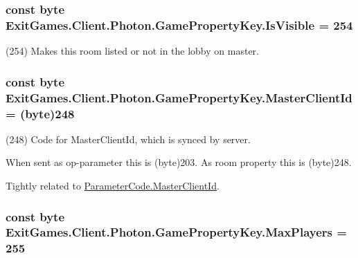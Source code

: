 \subsubsection[{\texorpdfstring{Is\+Visible}{IsVisible}}]{\setlength{\rightskip}{0pt plus 5cm}const byte Exit\+Games.\+Client.\+Photon.\+Game\+Property\+Key.\+Is\+Visible = 254}\hypertarget{class_exit_games_1_1_client_1_1_photon_1_1_game_property_key_a0993168380169958a6371abb880808ed}{}\label{class_exit_games_1_1_client_1_1_photon_1_1_game_property_key_a0993168380169958a6371abb880808ed}


(254) Makes this room listed or not in the lobby on master.

\subsubsection[{\texorpdfstring{Master\+Client\+Id}{MasterClientId}}]{\setlength{\rightskip}{0pt plus 5cm}const byte Exit\+Games.\+Client.\+Photon.\+Game\+Property\+Key.\+Master\+Client\+Id = (byte)248}\hypertarget{class_exit_games_1_1_client_1_1_photon_1_1_game_property_key_ae06d85caaaad94ef81bb048f4e8a9c3c}{}\label{class_exit_games_1_1_client_1_1_photon_1_1_game_property_key_ae06d85caaaad94ef81bb048f4e8a9c3c}


(248) Code for Master\+Client\+Id, which is synced by server. 

When sent as op-\/parameter this is (byte)203. As room property this is (byte)248.

Tightly related to \hyperlink{class_exit_games_1_1_client_1_1_photon_1_1_parameter_code_a1f3cfe3d4e33a66a1b43f69b61c1371d}{Parameter\+Code.\+Master\+Client\+Id}.
\subsubsection[{\texorpdfstring{Max\+Players}{MaxPlayers}}]{\setlength{\rightskip}{0pt plus 5cm}const byte Exit\+Games.\+Client.\+Photon.\+Game\+Property\+Key.\+Max\+Players = 255}\hypertarget{class_exit_games_1_1_client_1_1_photon_1_1_game_property_key_a824619ef3a7938a5152370fe41e87873}{}\label{class_exit_games_1_1_client_1_1_photon_1_1_game_property_key_a824619ef3a7938a5152370fe41e87873}


